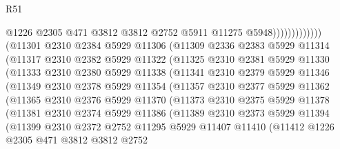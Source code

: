 \begin{lexlean}{R51}
\begin{coremodule}
                                  @1226
                                  @2305
                                  @471
                                  @3812
                                  @3812
                                  @2752
                                  @5911
                                  @11275
                                  @5948)))))))))))))
        (@11301
          @2310
          @2384
          @5929
          @11306
          (@11309
            @2336
            @2383
            @5929
            @11314
            (@11317
              @2310
              @2382
              @5929
              @11322
              (@11325
                @2310
                @2381
                @5929
                @11330
                (@11333
                  @2310
                  @2380
                  @5929
                  @11338
                  (@11341
                    @2310
                    @2379
                    @5929
                    @11346
                    (@11349
                      @2310
                      @2378
                      @5929
                      @11354
                      (@11357
                        @2310
                        @2377
                        @5929
                        @11362
                        (@11365
                          @2310
                          @2376
                          @5929
                          @11370
                          (@11373
                            @2310
                            @2375
                            @5929
                            @11378
                            (@11381
                              @2310
                              @2374
                              @5929
                              @11386
                              (@11389
                                @2310
                                @2373
                                @5929
                                @11394
                                (@11399
                                  @2310
                                  @2372
                                  @2752
                                  @11295
                                  @5929
                                  @11407
                                  @11410
                                  (@11412
                                    @1226
                                    @2305
                                    @471
                                    @3812
                                    @3812
                                    @2752

\end{coremodule}
\end{lexlean}
